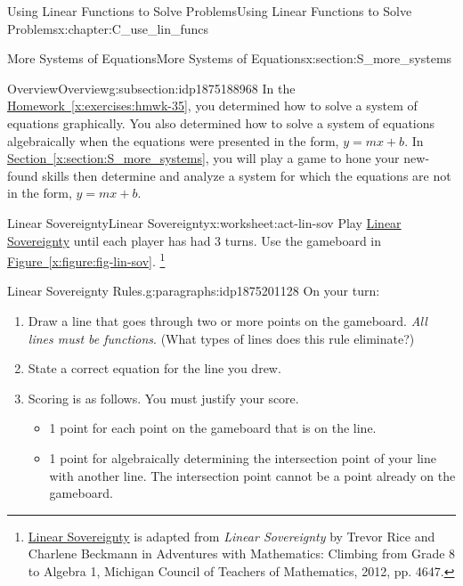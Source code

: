\documentclass[oneside,10pt,]{book}
\newcommand{\xreffont}{\relax}
\newcommand{\pubtitle}[1]{\textsl{#1}}
\numberwithin{equation}{chapter}
\begin{document}
\begin{chapterptx}{Using Linear Functions to Solve Problems}{}{Using Linear Functions to Solve Problems}{}{}{x:chapter:C_use_lin_funcs}
\begin{sectionptx}{More Systems of Equations}{}{More Systems of Equations}{}{}{x:section:S_more_systems}
%
%
\typeout{************************************************}
\typeout{************************************************}
%
\begin{subsectionptx}{Overview}{}{Overview}{}{}{g:subsection:idp1875188968}
In the \hyperref[x:exercises:hmwk-35]{Homework~{\xreffont\ref{x:exercises:hmwk-35}}}, you determined how to solve a system of equations graphically. You also determined how to solve a system of equations algebraically when the equations were presented in the form, \(y = mx + b\). In \hyperref[x:section:S_more_systems]{Section~{\xreffont\ref{x:section:S_more_systems}}}, you will play a game to hone your new-found skills then determine and analyze a system for which the equations are not in the form, \(y = mx + b\).%
\end{subsectionptx}
%
%
\typeout{************************************************}
\typeout{************************************************}
%
\begin{worksheet-subsection}{Linear Sovereignty}{}{Linear Sovereignty}{}{}{x:worksheet:act-lin-sov}
Play \hyperref[x:worksheet:act-lin-sov]{Linear Sovereignty} until each player has had 3 turns. Use the gameboard in \hyperref[x:figure:fig-lin-sov]{Figure~{\xreffont\ref{x:figure:fig-lin-sov}}}. \footnote{\hyperref[x:worksheet:act-lin-sov]{Linear Sovereignty} is adapted from \pubtitle{Linear Sovereignty} by Trevor Rice and Charlene Beckmann in Adventures with Mathematics: Climbing from Grade 8 to Algebra 1, Michigan Council of Teachers of Mathematics, 2012, pp. 46\textemdash{}47.\label{g:fn:idp1875196264}}%
\begin{paragraphs}{Linear Sovereignty Rules.}{g:paragraphs:idp1875201128}%
On your turn:%
\begin{enumerate}[label=(\alph*)]
\item{}Draw a line that goes through two or more points on the gameboard. \emph{All lines must be functions}. (What types of lines does this rule eliminate?)%
\item{}State a correct equation for the line you drew.%
\item{}Scoring is as follows. You must justify your score.%
\begin{itemize}[label=\textbullet]
\item{}1 point for each point on the gameboard that is on the line.%
\item{}1 point for algebraically determining the intersection point of your line with another line. The intersection point cannot be a point already on the gameboard.%

\end{itemize}
\end{enumerate}
\end{paragraphs}
\end{worksheet-subsection}
\end{sectionptx}
\end{chapterptx}
\end{document}
